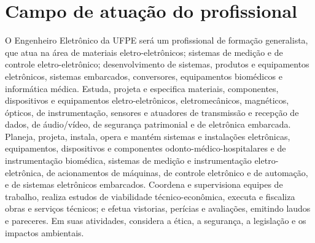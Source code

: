 \chapter{Campo de atuação do profissional}
\label{cap6}

O Engenheiro Eletrônico da UFPE será um profissional de formação generalista, que atua na área de materiais eletro-eletrônicos; sistemas de medição e de controle eletro-eletrônico; desenvolvimento de sistemas, produtos e equipamentos eletrônicos, sistemas embarcados, conversores, equipamentos biomédicos e informática médica. Estuda, projeta e especifica materiais, componentes, dispositivos e equipamentos eletro-eletrônicos, eletromecânicos, magnéticos, ópticos, de instrumentação, sensores e atuadores de transmissão e recepção de dados, de áudio/vídeo, de segurança patrimonial e de eletrônica embarcada. Planeja, projeta, instala, opera e mantém sistemas e instalações eletrônicas, equipamentos, dispositivos e componentes odonto-médico-hospitalares e de instrumentação biomédica, sistemas de medição e instrumentação eletro-eletrônica, de acionamentos de máquinas, de controle eletrônico e de automação, e de sistemas eletrônicos embarcados. Coordena e supervisiona equipes de trabalho, realiza estudos de viabilidade técnico-econômica, executa e fiscaliza obras e serviços técnicos; e efetua vistorias, perícias e avaliações, emitindo laudos e pareceres. Em suas atividades, considera a ética, a segurança, a legislação e os impactos ambientais.
